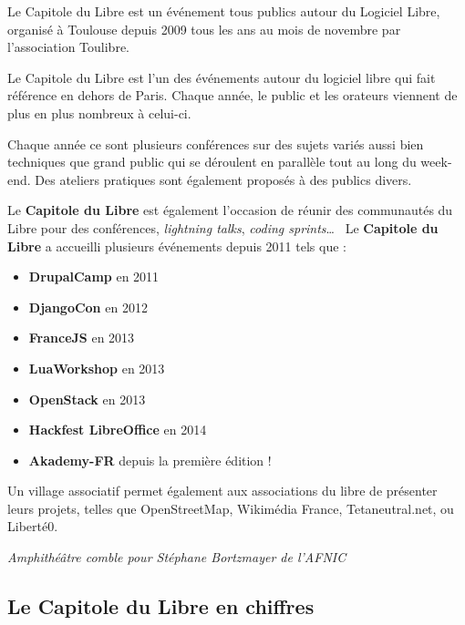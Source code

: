 
Le Capitole du Libre est un événement tous publics autour du Logiciel Libre,
 organisé à Toulouse depuis 2009 tous les ans au mois de novembre
 par l'association Toulibre.

Le Capitole du Libre est l'un des événements autour du logiciel libre
 qui fait référence en dehors de Paris.
 Chaque année, le public et les orateurs viennent de plus en plus nombreux
 à celui-ci.

Chaque année ce sont plusieurs conférences sur des sujets variés
 aussi bien techniques que grand public qui se déroulent en parallèle
 tout au long du week-end.
 Des ateliers pratiques sont également proposés à des publics divers.

\Separateur

Le \textbf{Capitole du Libre} est également l'occasion de réunir des 
communautés du Libre pour des conférences, \textit{lightning talks}, 
\textit{coding sprints}\dots ~ Le \textbf{Capitole du Libre} a 
accueilli plusieurs événements depuis 2011 tels que :
\begin{itemize}[label=$\bullet$]
\item \textbf{DrupalCamp} en 2011
\item \textbf{DjangoCon} en 2012
\item \textbf{FranceJS} en 2013
\item \textbf{LuaWorkshop} en 2013
\item \textbf{OpenStack} en 2013
\item \textbf{Hackfest LibreOffice}  en 2014
\item \textbf{Akademy-FR} depuis la première édition !
\end{itemize}

\Separateur

Un village associatif permet également aux associations du libre de
 présenter leurs projets, telles que OpenStreetMap, Wikimédia France, 
Tetaneutral.net, ou Liberté0.

\begin{center}
\textit{Amphithéâtre comble pour Stéphane Bortzmayer de l'AFNIC}
\end{center}

\subsection{Le Capitole du Libre en chiffres}

